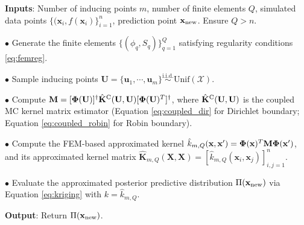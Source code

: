 \documentclass[aos,preprint]{imsart}
\theoremstyle{plain}
\newcommand{\BFx}{\bold x}
\newcommand{\BU}{\bold U}
\newcommand{\BK}{\bold K}
\newcommand{\BPhi}{\boldsymbol{\Phi}}
\theoremstyle{remark}
\begin{document}
\begin{algorithm}[!t]
    \caption{FEM-Based Approximation of the Posterior Predictive Distribution}

\justifying

        \noindent \textbf{Inputs}: Number of inducing points $m$, number of finite elements $Q$, simulated data points $\{(\mathbf{x}_i,f(\mathbf{x}_i)\}_{i=1}^n$, prediction point $\mathbf{x}_{\rm new}$. Ensure $Q > n$.\\
        \vspace{-0.35cm}
        
        \noindent $\bullet$ Generate the finite elements $\{(\phi_q, S_q)\}_{q=1}^Q$ satisfying regularity conditions \eqref{eq:femreg}.\\
        \vspace{-0.2cm}

        \noindent $\bullet$ Sample inducing points $\mathbf{U} = \{\mathbf{u}_1, \cdots, \mathbf{u}_m\} \overset{\text{i.i.d.}}{\sim}\text{Unif}(\mathcal{X})$.\\
        \vspace{-0.35cm}

        \noindent $\bullet$ Compute $\mathbf{M} = [\BPhi(\BU)]^\dagger \hat{\BK}^{\rm C}(\BU, \BU) [\BPhi(\BU)^T]^\dagger$, where $ \hat{\BK}^{\rm C}(\BU, \BU)$ is the coupled MC kernel matrix estimator (Equation \eqref{eq:coupled_dir} for Dirichlet boundary; Equation \eqref{eq:coupled_robin} for Robin boundary).\\
        \vspace{-0.35cm}

        \noindent $\bullet$ Compute the FEM-based approximated kernel $\hat{k}_{m,Q}(\mathbf{x},\mathbf{x}') = \BPhi(\BFx)^T \mathbf{M} \BPhi(\BFx')$, and its approximated kernel matrix $\hat{\mathbf{K}}_{m,Q}(\mathbf{X},\mathbf{X}) = [\hat{{k}}_{m,Q}(\mathbf{x}_i,\mathbf{x}_j)]_{i,j=1}^n$.\\
        \vspace{-0.35cm}

        \noindent $\bullet$ Evaluate the approximated posterior predictive distribution ${\Pi}(\mathbf{x}_{\rm new})$ via Equation \eqref{eq:kriging} with $k = \hat{k}_{m,Q}$.\\
        \vspace{-0.35cm}
        
   \noindent \textbf{Output}: Return ${\Pi}(\mathbf{x}_{\rm new})$.
    \label{alg:fem}
\end{algorithm}
\end{document}
